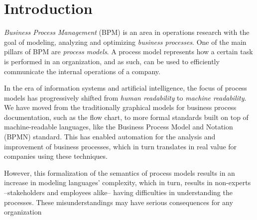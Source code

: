\chapter{Introduction}
\label{cha:intro}



\textit{Business Process Management} (BPM) is an area in operations research
with the goal of modeling, analyzing and optimizing \textit{business processes}.
One of the main pillars of BPM are \emph{process models}. A process model 
represents how a certain task is performed in an organization, and as such, can be
used to efficiently communicate the internal operations of a company.

In the era of information systems and artificial intelligence, the
focus of process models has progressively shifted from \textit{human readability} to
\textit{machine readability}\cite{ter2009modern}. We have moved from the traditionally graphical
models for business process documentation, such as the flow chart, to more
formal standards built on top of machine-readable languages, like the Business
Process Model and Notation (BPMN)\cite{chinosi2012bpmn} standard. This has
enabled automation for the analysis and improvement of business processes, which
in turn translates in real value for companies using these techniques.

However, this formalization of the semantics of process models results in an
increase in modeling languages' complexity, which in turn, results in
non-experts --stakeholders and employees alike-- having difficulties in
understanding the processes\cite{leopold2014supporting}. These misunderstandings may
have serious consequences for any organization\cite{van2015fragmentation}

